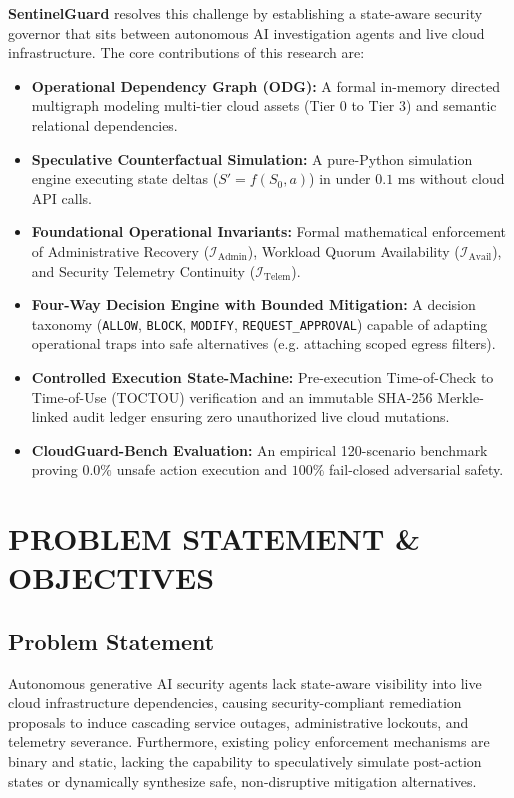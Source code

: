\documentclass[12pt,a4paper]{report}
\begin{document}
\textbf{SentinelGuard} resolves this challenge by establishing a state-aware security governor that sits between autonomous AI investigation agents and live cloud infrastructure. The core contributions of this research are:
\begin{itemize}
    \item \textbf{Operational Dependency Graph (ODG):} A formal in-memory directed multigraph modeling multi-tier cloud assets (Tier 0 to Tier 3) and semantic relational dependencies.
    \item \textbf{Speculative Counterfactual Simulation:} A pure-Python simulation engine executing state deltas ($S' = f(S_0, a)$) in under $0.1$ ms without cloud API calls.
    \item \textbf{Foundational Operational Invariants:} Formal mathematical enforcement of Administrative Recovery ($\mathcal{I}_{\text{Admin}}$), Workload Quorum Availability ($\mathcal{I}_{\text{Avail}}$), and Security Telemetry Continuity ($\mathcal{I}_{\text{Telem}}$).
    \item \textbf{Four-Way Decision Engine with Bounded Mitigation:} A decision taxonomy (\texttt{ALLOW}, \texttt{BLOCK}, \texttt{MODIFY}, \texttt{REQUEST\_APPROVAL}) capable of adapting operational traps into safe alternatives (e.g. attaching scoped egress filters).
    \item \textbf{Controlled Execution State-Machine:} Pre-execution Time-of-Check to Time-of-Use (TOCTOU) verification and an immutable SHA-256 Merkle-linked audit ledger ensuring zero unauthorized live cloud mutations.
    \item \textbf{CloudGuard-Bench Evaluation:} An empirical 120-scenario benchmark proving $0.0\%$ unsafe action execution and $100\%$ fail-closed adversarial safety.
\end{itemize}

\chapter{PROBLEM STATEMENT \& OBJECTIVES}

\section{Problem Statement}\label{sec:prob_statement}
Autonomous generative AI security agents lack state-aware visibility into live cloud infrastructure dependencies, causing security-compliant remediation proposals to induce cascading service outages, administrative lockouts, and telemetry severance. Furthermore, existing policy enforcement mechanisms are binary and static, lacking the capability to speculatively simulate post-action states or dynamically synthesize safe, non-disruptive mitigation alternatives.
\end{document}
